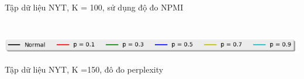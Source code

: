 \documentclass[pdf]{beamer}
\begin{document}
\begin{frame}{Tập dữ liệu NYT, K = 100, sử dụng độ đo NPMI }
\begin{columns}[T]
\begin{column}{.50\textwidth}
\begin{figure}
	\end{figure}				
\end{column} %
\end{columns}
\begin{center}
\includegraphics[width=1\textwidth]{menu.png}	
\end{center}
\end{frame}

\begin{frame}{Tập dữ liệu NYT, K =150, đô đo perplexity}
\begin{columns}[T] %
\begin{column}{.50\textwidth}
\begin{figure}
\end{figure}
\end{column} %
\hfill%
\begin{column}{.50\textwidth}
\begin{figure}

\end{figure}
\end{column}
\end{columns}
\end{frame}
\end{document}
